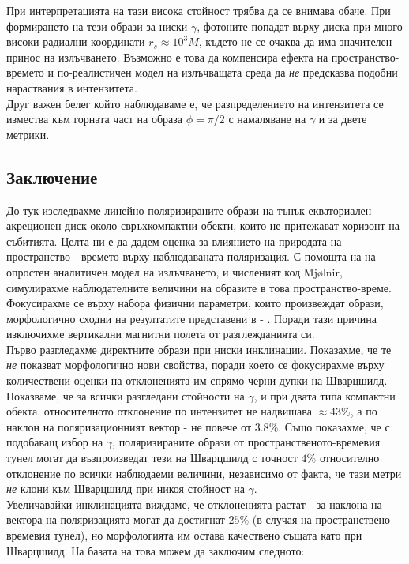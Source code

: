 \documentclass[12pt]{article}
\numberwithin{equation}{section}
\numberwithin{figure}{section}
\begin{document}
	При интерпретацията на тази висока стойност трябва да се внимава обаче. При формирането на тези образи за ниски $\gamma$, фотоните попадат върху диска при много високи радиални координати $r_s\approx 10^3M$, където не се очаква да има значителен принос на излъчването. Възможно е това да компенсира ефекта на пространство-времето и по-реалистичен модел на излъчващата среда да \emph{не} предсказва подобни нараствания в интензитета. \\
	
	Друг важен белег който наблюдаваме е, че разпределението на интензитета се измества към горната част на образа $\phi = \pi / 2$ с намаляване на $\gamma$ и за двете метрики.
	
	 \subsection{Заключение}
	
	До тук изследвахме линейно поляризираните образи на тънък екваториален акреционен диск около свръхкомпактни обекти, които не притежават хоризонт на събитията. Целта ни е да дадем оценка за влиянието на природата на пространство - времето върху наблюдаваната поляризация. С помощта на на опростен аналитичен модел на излъчването, и численият код Mjølnir, симулирахме наблюдателните величини на образите в това пространство-време. Фокусирахме се върху набора физични параметри, които произвеждат образи, морфологично сходни на резултатите представени в \cite{EHT_M87_I} - \cite{EHT_M87_VIII}. Поради тази причина изключихме вертикални магнитни полета от разглежданията си.\\
	
	Първо разгледахме директните образи при ниски инклинации. Показахме, че те \emph{не} показват морфологично нови свойства, поради което се фокусирахме върху количествени оценки на отклоненията им спрямо черни дупки на Шварцшилд. Показваме, че за всички разгледани стойности на $\gamma$, и при двата типа компактни обекта, относителното отклонение по интензитет не надвишава $\approx 43\%$, а по наклон на поляризационният вектор - не повече от $3.8\%$. Също показахме, че с подобаващ избор на $\gamma$, поляризираните образи от пространственото-времевия тунел могат да възпроизведат тези на Шварцшилд с точност $4\%$ относително отклонение по всички наблюдаеми величини, независимо от факта, че тази метри \emph{не} клони към Шварцшилд при никоя стойност на $\gamma$. \\
	
	Увеличавайки инклинацията виждаме, че отклоненията растат - за наклона на вектора на поляризацията могат да достигнат $25\%$ (в случая на пространствено-времевия тунел), но морфологията им остава качествено същата като при Шварцшилд. На базата на това можем да заключим следното:\\
	
\end{document}
